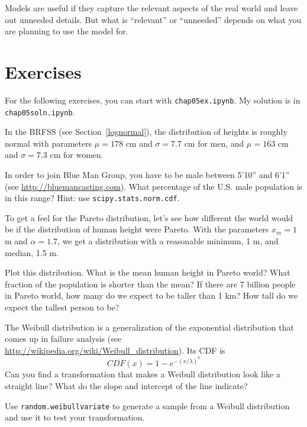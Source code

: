 \documentclass[12pt]{book}
\begin{document}
Models are useful if they capture the relevant aspects of the
real world and leave out unneeded details.  But what is ``relevant''
or ``unneeded'' depends on what you are planning to use the model
for.


\section{Exercises}

For the following exercises, you can start with \verb"chap05ex.ipynb".
My solution is in \verb"chap05soln.ipynb".

\begin{exercise}
In the BRFSS (see Section~\ref{lognormal}), the distribution of
heights is roughly normal with parameters $\mu = 178$ cm and
$\sigma = 7.7$ cm for men, and $\mu = 163$ cm and $\sigma = 7.3$ cm for
women.

In order to join Blue Man Group, you have to be male between 5'10''
and 6'1'' (see \url{http://bluemancasting.com}).  What percentage of
the U.S. male population is in this range?  Hint: use
\verb"scipy.stats.norm.cdf".

\end{exercise}


\begin{exercise}
To get a feel for the Pareto distribution, let's see how different
the world
would be if the distribution of human height were Pareto.
With the parameters $x_{m} = 1$ m and $\alpha = 1.7$, we
get a distribution with a reasonable minimum, 1 m,
and median, 1.5 m.

Plot this distribution.  What is the mean human height in Pareto
world?  What fraction of the population is shorter than the mean?  If
there are 7 billion people in Pareto world, how many do we expect to
be taller than 1 km?  How tall do we expect the tallest person to be?

\end{exercise}


\begin{exercise}
\label{weibull}

The Weibull distribution is a generalization of the exponential
distribution that comes up in failure analysis
(see \url{http://wikipedia.org/wiki/Weibull_distribution}).  Its CDF is
%
\[ CDF(x) = 1 - e^{-(x / \lambda)^k} \]
%
Can you find a transformation that makes a Weibull distribution look
like a straight line?  What do the slope and intercept of the
line indicate?

Use \verb"random.weibullvariate" to generate a sample from a
Weibull distribution and use it to test your transformation.

\end{exercise}
\end{document}
